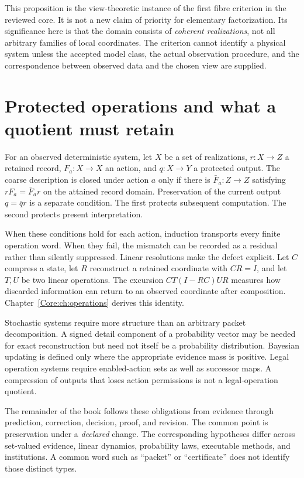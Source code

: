 \documentclass[11pt,oneside,openany]{book}
\numberwithin{equation}{section}
\begin{document}
This proposition is the view-theoretic instance of the first fibre criterion in the reviewed core. It is not a new claim of priority for elementary factorization. Its significance here is that the domain consists of \emph{coherent realizations}, not all arbitrary families of local coordinates. The criterion cannot identify a physical system unless the accepted model class, the actual observation procedure, and the correspondence between observed data and the chosen view are supplied.

\section*{Protected operations and what a quotient must retain}
For an observed deterministic system, let $X$ be a set of realizations, $r:X\to Z$ a retained record, $F_a:X\to X$ an action, and $q:X\to Y$ a protected output. The coarse description is closed under action $a$ only if there is $\bar F_a:Z\to Z$ satisfying $rF_a=\bar F_a r$ on the attained record domain. Preservation of the current output $q=\bar q r$ is a separate condition. The first protects subsequent computation. The second protects present interpretation.

When these conditions hold for each action, induction transports every finite operation word. When they fail, the mismatch can be recorded as a residual rather than silently suppressed. Linear resolutions make the defect explicit. Let $C$ compress a state, let $R$ reconstruct a retained coordinate with $CR=I$, and let $T,U$ be two linear operations. The excursion $CT(I-RC)UR$ measures how discarded information can return to an observed coordinate after composition. Chapter~\ref{Core:ch:operations} derives this identity.

Stochastic systems require more structure than an arbitrary packet decomposition. A signed detail component of a probability vector may be needed for exact reconstruction but need not itself be a probability distribution. Bayesian updating is defined only where the appropriate evidence mass is positive. Legal operation systems require enabled-action sets as well as successor maps. A compression of outputs that loses action permissions is not a legal-operation quotient.

The remainder of the book follows these obligations from evidence through prediction, correction, decision, proof, and revision. The common point is preservation under a \emph{declared} change. The corresponding hypotheses differ across set-valued evidence, linear dynamics, probability laws, executable methods, and institutions. A common word such as ``packet'' or ``certificate'' does not identify those distinct types.
\end{document}
